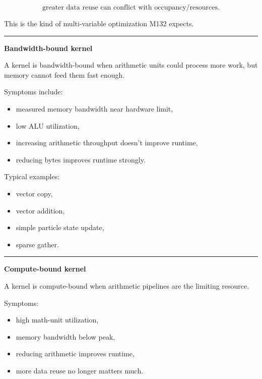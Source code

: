 \[
\boxed{
\text{greater data reuse can conflict with occupancy/resources}.
}
\]

This is the kind of multi-variable optimization M132 expects.

\begin{center}\rule{0.5\linewidth}{0.5pt}\end{center}

\textbf{Bandwidth-bound kernel}

A kernel is bandwidth-bound when arithmetic units could process more work, but memory cannot feed them fast enough.

Symptoms include:

\begin{itemize}
\tightlist
\item
  measured memory bandwidth near hardware limit,
\item
  low ALU utilization,
\item
  increasing arithmetic throughput doesn't improve runtime,
\item
  reducing bytes improves runtime strongly.
\end{itemize}

Typical examples:

\begin{itemize}
\tightlist
\item
  vector copy,
\item
  vector addition,
\item
  simple particle state update,
\item
  sparse gather.
\end{itemize}

\begin{center}\rule{0.5\linewidth}{0.5pt}\end{center}

\textbf{Compute-bound kernel}

A kernel is compute-bound when arithmetic pipelines are the limiting resource.

Symptoms:

\begin{itemize}
\tightlist
\item
  high math-unit utilization,
\item
  memory bandwidth below peak,
\item
  reducing arithmetic improves runtime,
\item
  more data reuse no longer matters much.
\end{itemize}


